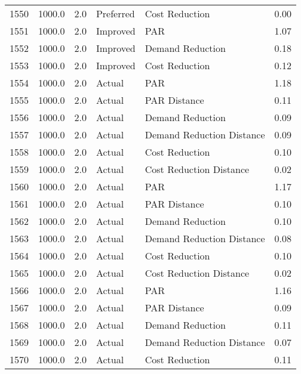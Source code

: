 \begin{longtable}{lrrllr}
1550 &       1000.0 &     2.0 &      Preferred &             Cost Reduction &   0.00 \\
1551 &       1000.0 &     2.0 &       Improved &                        PAR &   1.07 \\
1552 &       1000.0 &     2.0 &       Improved &           Demand Reduction &   0.18 \\
1553 &       1000.0 &     2.0 &       Improved &             Cost Reduction &   0.12 \\
1554 &       1000.0 &     2.0 &         Actual &                        PAR &   1.18 \\
1555 &       1000.0 &     2.0 &         Actual &               PAR Distance &   0.11 \\
1556 &       1000.0 &     2.0 &         Actual &           Demand Reduction &   0.09 \\
1557 &       1000.0 &     2.0 &         Actual &  Demand Reduction Distance &   0.09 \\
1558 &       1000.0 &     2.0 &         Actual &             Cost Reduction &   0.10 \\
1559 &       1000.0 &     2.0 &         Actual &    Cost Reduction Distance &   0.02 \\
1560 &       1000.0 &     2.0 &         Actual &                        PAR &   1.17 \\
1561 &       1000.0 &     2.0 &         Actual &               PAR Distance &   0.10 \\
1562 &       1000.0 &     2.0 &         Actual &           Demand Reduction &   0.10 \\
1563 &       1000.0 &     2.0 &         Actual &  Demand Reduction Distance &   0.08 \\
1564 &       1000.0 &     2.0 &         Actual &             Cost Reduction &   0.10 \\
1565 &       1000.0 &     2.0 &         Actual &    Cost Reduction Distance &   0.02 \\
1566 &       1000.0 &     2.0 &         Actual &                        PAR &   1.16 \\
1567 &       1000.0 &     2.0 &         Actual &               PAR Distance &   0.09 \\
1568 &       1000.0 &     2.0 &         Actual &           Demand Reduction &   0.11 \\
1569 &       1000.0 &     2.0 &         Actual &  Demand Reduction Distance &   0.07 \\
1570 &       1000.0 &     2.0 &         Actual &             Cost Reduction &   0.11 \\

\end{longtable}
